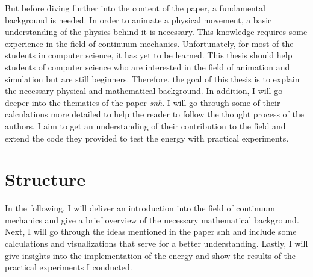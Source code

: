 But before diving further into the content of the paper, a fundamental background is needed. In order to animate a physical movement, a basic understanding of the physics behind it is necessary. This knowledge requires some experience in the field of continuum mechanics. Unfortunately, for most of the students in computer science, it has yet to be learned. This thesis should help students of computer science who are interested in the field of animation and simulation but are still beginners. Therefore, the goal of this thesis is to explain the necessary physical and mathematical background. In addition, I will go deeper into the thematics of the paper \textit{\acrshort {snh}}. I will go through some of their calculations more detailed to help the reader to follow the thought process of the authors.
I aim to get an understanding of their contribution to the field and extend the code they provided to test the energy with practical experiments.

\section{Structure}
In the following, I will deliver an introduction into the field of continuum mechanics and give a brief overview of the necessary mathematical background. Next, I will go through the ideas mentioned in the paper \acrshort{snh} and include some calculations and visualizations that serve for a better understanding. Lastly, I will give insights into the implementation of the energy and show the results of the practical experiments I conducted.